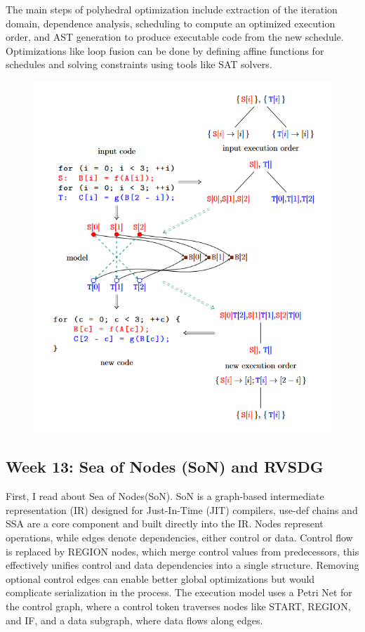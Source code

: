 \documentclass[11pt, a4paper, titlepage]{article}
\begin{document}
The main steps of polyhedral optimization include extraction of the iteration domain, dependence analysis, scheduling to compute an optimized execution order, and AST generation to produce executable code from the new schedule. Optimizations like loop fusion can be done by defining affine functions for schedules and solving constraints using tools like SAT solvers.

\begin{figure}[H]
  \centering
  \includegraphics[scale=0.4]{images/r20.png}
\end{figure}

\subsection{Week 13: Sea of Nodes (SoN) and RVSDG }

First, I read about Sea of Nodes(SoN). SoN is a graph-based intermediate representation (IR) designed for Just-In-Time (JIT) compilers, use-def chains and SSA are a core component and built directly into the IR. Nodes represent operations, while edges denote dependencies, either control or data. Control flow is replaced by REGION nodes, which merge control values from predecessors, this effectively unifies control and data dependencies into a single structure. Removing optional control edges can enable better global optimizations but would complicate serialization in the process. The execution model uses a Petri Net for the control graph, where a control token traverses nodes like START, REGION, and IF, and a data subgraph, where data flows along edges.
\end{document}
